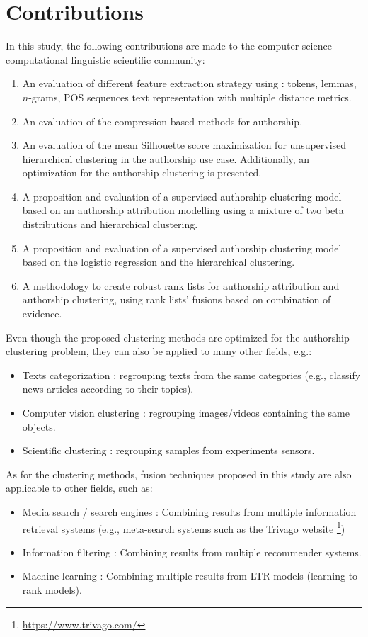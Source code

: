 \section{Contributions}

In this study, the following contributions are made to the computer science computational linguistic scientific community:

\begin{enumerate}
  \item
  An evaluation of different feature extraction strategy using : tokens, lemmas, $n$-grams, POS sequences text representation with multiple distance metrics.
  \item
  An evaluation of the compression-based methods for authorship.
  \item
  An evaluation of the mean Silhouette score maximization for unsupervised hierarchical clustering in the authorship use case. Additionally, an optimization for the authorship clustering is presented.
  \item
  A proposition and evaluation of a supervised authorship clustering model based on an authorship attribution modelling using a mixture of two beta distributions and hierarchical clustering.
  \item
  A proposition and evaluation of a supervised authorship clustering model based on the logistic regression and the hierarchical clustering.
  \item
  A methodology to create robust rank lists for authorship attribution and authorship clustering, using rank lists' fusions based on combination of evidence.
\end{enumerate}

Even though the proposed clustering methods are optimized for the authorship clustering problem, they can also be applied to many other fields, e.g.:
\begin{itemize}
  \item
  Texts categorization : regrouping texts from the same categories (e.g., classify news articles according to their topics).
  \item
  Computer vision clustering : regrouping images/videos containing the same objects.
  \item
  Scientific clustering : regrouping samples from experiments sensors.
\end{itemize}

As for the clustering methods, fusion techniques proposed in this study are also applicable to other fields, such as:
\begin{itemize}
  \item
  Media search / search engines : Combining results from multiple information retrieval systems (e.g., meta-search systems such as the Trivago website \footnote{\url{https://www.trivago.com/}})
  \item
  Information filtering : Combining results from multiple recommender systems.
  \item
  Machine learning : Combining multiple results from LTR models (learning to rank models).
\end{itemize}
